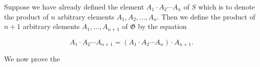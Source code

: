 Suppose we have already defined the element $A_1 \cdot A_2 \cdots A_n$ of $S$ which is to denote the product of $n$ arbitrary elements $A_1, A_2, \ldots, A_n$. Then we define the product of $n + 1$ arbitrary elements $A_1, \ldots, A_{n+1}$ of $\mathfrak{G}$ by the equation

$$A_1 \cdot A_2 \cdots A_{n+1} = (A_1 \cdot A_2 \cdots A_n) \cdot A_{n+1}.$$

We now prove the
